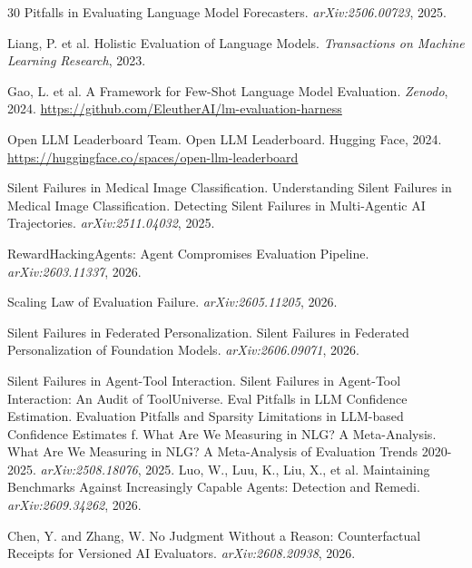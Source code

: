 \documentclass[11pt]{article}
\begin{document}
\begin{thebibliography}{30}
Pitfalls in Evaluating Language Model Forecasters.
\newblock \emph{arXiv:2506.00723}, 2025.

Liang, P. et al.
\newblock Holistic Evaluation of Language Models.
\newblock \emph{Transactions on Machine Learning Research}, 2023.

Gao, L. et al.
\newblock A Framework for Few-Shot Language Model Evaluation.
\newblock \emph{Zenodo}, 2024. \url{https://github.com/EleutherAI/lm-evaluation-harness}

Open LLM Leaderboard Team.
\newblock Open LLM Leaderboard.
\newblock Hugging Face, 2024. \url{https://huggingface.co/spaces/open-llm-leaderboard}

Silent Failures in Medical Image Classification.
\newblock Understanding Silent Failures in Medical Image Classification. 
Detecting Silent Failures in Multi-Agentic AI Trajectories.
\newblock \emph{arXiv:2511.04032}, 2025.

RewardHackingAgents: Agent Compromises Evaluation Pipeline.
\newblock \emph{arXiv:2603.11337}, 2026.

Scaling Law of Evaluation Failure.
\newblock \emph{arXiv:2605.11205}, 2026.

Silent Failures in Federated Personalization.
\newblock Silent Failures in Federated Personalization of Foundation Models. \newblock \emph{arXiv:2606.09071}, 2026.

Silent Failures in Agent-Tool Interaction.
\newblock Silent Failures in Agent-Tool Interaction: An Audit of ToolUniverse. 
Eval Pitfalls in LLM Confidence Estimation.
\newblock Evaluation Pitfalls and Sparsity Limitations in LLM-based Confidence Estimates f. 
What Are We Measuring in NLG? A Meta-Analysis.
\newblock What Are We Measuring in NLG? A Meta-Analysis of Evaluation Trends 2020-2025. \newblock \emph{arXiv:2508.18076}, 2025.
Luo, W., Luu, K., Liu, X., et al.
\newblock Maintaining Benchmarks Against Increasingly Capable Agents: Detection and Remedi. \newblock \emph{arXiv:2609.34262}, 2026.

Chen, Y. and Zhang, W.
\newblock No Judgment Without a Reason: Counterfactual Receipts for Versioned AI Evaluators.
\newblock \emph{arXiv:2608.20938}, 2026.


\end{thebibliography}
\end{document}
